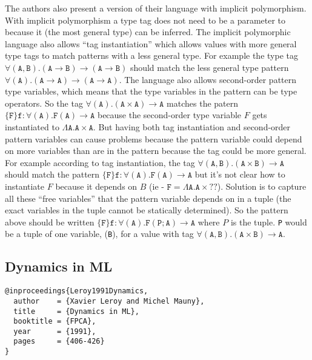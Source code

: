 \documentclass[12pt]{article}	%
\begin{document}
The authors also present a version of their language with implicit polymorphism. With implicit polymorphism a type tag does not need to be a parameter to \dynamic because it (the most general type) can be inferred. The implicit polymorphic language also allows ``tag instantiation'' which allows \Dynamic values with more general type tags to match patterns with a less general type. For example the type tag $\mathtt{\forall (A,B).(A \rightarrow B)\rightarrow (A \rightarrow B)}$ should match the less general type pattern $\mathtt{\forall (A).(A \rightarrow A)\rightarrow (A \rightarrow A)}$. The language also allows second-order pattern type variables, which means that the type variables in the pattern can be type operators. So the tag $\mathtt{\forall(A).(A\times A)\rightarrow A}$ matches the patern $\mathtt{\{F\}f:\forall (A).F(A)\rightarrow A}$ because the second-order type variable $F$ gets instantiated to $\mathtt{\Lambda A.A\times A}$. But having both tag instantiation and second-order pattern variables can cause problems because the pattern variable could depend on more variables than are in the pattern because the tag could be more general. For example according to tag instantiation, the tag $\mathtt{\forall(A,B).(A\times B)\rightarrow A}$ should match the pattern $\mathtt{\{F\}f:\forall (A).F(A)\rightarrow A}$ but it's not clear how to instantiate $F$ because it depends on $B$ (ie - $\mathtt{F = \Lambda A.A\times ??}$). Solution is to capture all these ``free variables'' that the pattern variable depends on in a tuple (the exact variables in the tuple cannot be statically determined). So the pattern above should be written $\mathtt{\{F\}f:\forall (A).F(P;A)\rightarrow A}$ where $P$ is the tuple. \texttt{P} would be a tuple of one variable, (\texttt{B}), for a \Dynamic value with tag $\mathtt{\forall(A,B).(A\times B)\rightarrow A}$.









\subsection*{Dynamics in ML~\cite{Leroy1991Dynamics}}
\begin{verbatim}
@inproceedings{Leroy1991Dynamics,
  author    = {Xavier Leroy and Michel Mauny},
  title     = {Dynamics in ML},
  booktitle = {FPCA},
  year      = {1991},
  pages     = {406-426}
}
\end{verbatim}
\end{document}
